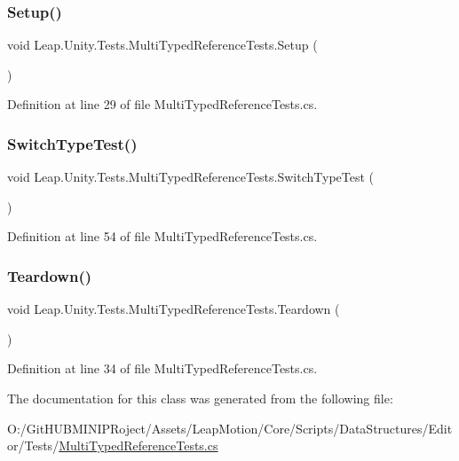 \subsubsection{\texorpdfstring{Setup()}{Setup()}}
{\footnotesize\ttfamily void Leap.\+Unity.\+Tests.\+Multi\+Typed\+Reference\+Tests.\+Setup (\begin{DoxyParamCaption}{ }\end{DoxyParamCaption})}



Definition at line 29 of file Multi\+Typed\+Reference\+Tests.\+cs.

\mbox{\label{class_leap_1_1_unity_1_1_tests_1_1_multi_typed_reference_tests_a8f04e00a4092e378462b39dd15b735c6}} 
\subsubsection{\texorpdfstring{SwitchTypeTest()}{SwitchTypeTest()}}
{\footnotesize\ttfamily void Leap.\+Unity.\+Tests.\+Multi\+Typed\+Reference\+Tests.\+Switch\+Type\+Test (\begin{DoxyParamCaption}{ }\end{DoxyParamCaption})}



Definition at line 54 of file Multi\+Typed\+Reference\+Tests.\+cs.

\mbox{\label{class_leap_1_1_unity_1_1_tests_1_1_multi_typed_reference_tests_aa080a2a3bc977eaf3b40964fae60860c}} 
\subsubsection{\texorpdfstring{Teardown()}{Teardown()}}
{\footnotesize\ttfamily void Leap.\+Unity.\+Tests.\+Multi\+Typed\+Reference\+Tests.\+Teardown (\begin{DoxyParamCaption}{ }\end{DoxyParamCaption})}



Definition at line 34 of file Multi\+Typed\+Reference\+Tests.\+cs.



The documentation for this class was generated from the following file\+:\begin{DoxyCompactItemize}
\item 
O\+:/\+Git\+H\+U\+B\+M\+I\+N\+I\+P\+Roject/\+Assets/\+Leap\+Motion/\+Core/\+Scripts/\+Data\+Structures/\+Editor/\+Tests/\mbox{\hyperlink{_multi_typed_reference_tests_8cs}{Multi\+Typed\+Reference\+Tests.\+cs}}\end{DoxyCompactItemize}
